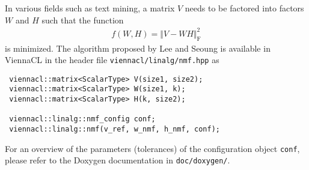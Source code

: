 In various fields such as text mining, a matrix $V$ needs to be factored into factors $W$ and $H$ such that the function
\begin{align*}
 f(W, H) = \Vert V - WH \Vert_{\mathrm{F}}^2
\end{align*}
is minimized. The algorithm proposed by Lee and Seoung \cite{lee:nmf} is available in ViennaCL in the header file \texttt{viennacl/linalg/nmf.hpp} as
\begin{lstlisting}
 viennacl::matrix<ScalarType> V(size1, size2);
 viennacl::matrix<ScalarType> W(size1, k);
 viennacl::matrix<ScalarType> H(k, size2);

 viennacl::linalg::nmf_config conf;
 viennacl::linalg::nmf(v_ref, w_nmf, h_nmf, conf);
\end{lstlisting}
For an overview of the parameters (tolerances) of the configuration object \lstinline|conf|, please refer to the Doxygen documentation in \texttt{doc/doxygen/}.
